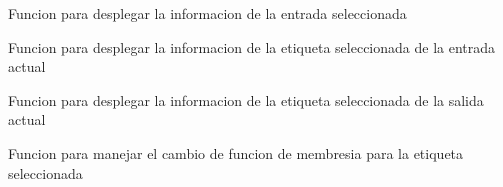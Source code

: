 \documentclass[letterpaper,10pt,spanish]{sphinxmanual}
\begin{document}
\begin{fulllineitems}
\label{\detokenize{codigos/FuzzyHandler:FuzzyHandler.seleccion_entrada}}
Funcion para desplegar la informacion de la entrada seleccionada

\end{fulllineitems}


\begin{fulllineitems}
\label{\detokenize{codigos/FuzzyHandler:FuzzyHandler.seleccion_etiqueta_in}}
Funcion para desplegar la informacion de la etiqueta seleccionada de la entrada actual

\end{fulllineitems}


\begin{fulllineitems}
\label{\detokenize{codigos/FuzzyHandler:FuzzyHandler.seleccion_etiqueta_out}}
Funcion para desplegar la informacion de la etiqueta seleccionada de la salida actual

\end{fulllineitems}


\begin{fulllineitems}
\label{\detokenize{codigos/FuzzyHandler:FuzzyHandler.seleccion_mf_in}}
Funcion para manejar el cambio de funcion de membresia para la etiqueta seleccionada

\end{fulllineitems}

\end{document}
